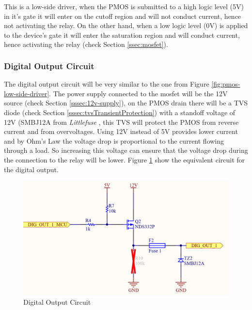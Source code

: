			This is a low-side driver, when the PMOS is submitted to a high logic level (5V) in it's gate it will enter on the cutoff region and will not conduct current, hence not activating the relay. On the other hand, when a low logic level (0V) is applied to the device's gate it will enter the saturation region and will conduct current, hence activating the relay (check Section \ref{ssec:mosfet}).

		\subsubsection{Digital Output Circuit}\label{sssec:digital-output-circuit}

			The digital output circuit will be very similar to the one from Figure \ref{fig:pmos-low-side-driver}. The power supply connected to the mosfet will be the 12V source (check Section \ref{sssec:12v-supply}), on the PMOS drain there will be a TVS diode (check Section \ref{sssec:tvsTransientProtection}) with a standoff voltage of 12V (SMBJ12A from \textit{Littlefuse} \cite{smbj12a-datasheet}, this TVS will protect the PMOS from reverse current and from overvoltages. Using 12V instead of 5V provides lower current and by Ohm's Law the voltage drop is proportional to the current flowing through a load. So increasing this voltage can ensure that the voltage drop during the connection to the relay will be lower. Figure \ref{fig:digital-output-circuit} show the equivalent circuit for the digital output.

			\begin{figure}[htbp]
				\centering
				\includegraphics[scale=1]{figuras/fig-digital-output-circuit.png}
				\caption{Digital Output Circuit \cite{digital-output-circuit}}
				\label{fig:digital-output-circuit}
			\end{figure}

